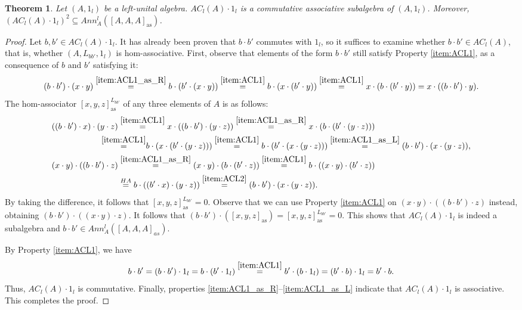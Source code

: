 \documentclass[12pt]{article}
\newtheorem{theorem}{Theorem}
\begin{document}
		\begin{theorem}\label{thm:ACL1_subalgebra}
			Let $(A,1_l)$ be a left-unital algebra. $AC_l(A)\cdot 1_l$ is a commutative associative subalgebra of $(A,1_l)$.
			Moreover, $\left(AC_l(A)\cdot 1_l\right)^2\subseteq Ann_A^l([A,A,A]_{\mathrm{as}})$.
		\end{theorem}
		\begin{proof}
			Let $b,b'\in AC_l(A)\cdot 1_l$. It has already been proven that $b\cdot b'$ commutes with $1_l$, so it suffices to examine whether $b\cdot b'\in AC_l(A)$, that is, whether $(A,L_{bb'},1_l)$ is hom-associative. First, observe that elements of the form $b\cdot b'$ still satisfy Property \ref{item:ACL1}, as a consequence of $b$ and $b'$ satisfying it:
			\begin{equation*}
				(b\cdot b')\cdot (x\cdot y)\overset{\ref{item:ACL1_as_R}}{=}b\cdot (b'\cdot (x\cdot y))\overset{\ref{item:ACL1}}{=}b\cdot (x\cdot (b'\cdot y))\overset{\ref{item:ACL1}}{=}x\cdot (b\cdot (b'\cdot y))=x\cdot ((b\cdot b')\cdot y).
			\end{equation*}
			The hom-associator $[x,y,z]_{\mathrm{as}}^{L_{bb'}}$ of any three elements of $A$ is as follows:
			\begin{align*}
				& ((b\cdot b')\cdot x)\cdot (y\cdot z)\overset{\ref{item:ACL1}}{=}x\cdot ((b\cdot b')\cdot (y\cdot z))\overset{\ref{item:ACL1_as_R}}{=}x\cdot (b\cdot (b'\cdot (y\cdot z)))\\
				& \hspace{2.1cm} \overset{\ref{item:ACL1}}{{=}}b\cdot (x\cdot (b'\cdot (y\cdot z)))\overset{\ref{item:ACL1}}{=}b\cdot (b'\cdot (x\cdot (y\cdot z)))\overset{\ref{item:ACL1_as_L}}{=}(b\cdot b')\cdot (x\cdot (y\cdot z)),\\
				& (x\cdot y)\cdot ((b\cdot b')\cdot z)\overset{\ref{item:ACL1_as_R}}{=}(x\cdot y)\cdot (b\cdot (b'\cdot z))\overset{\ref{item:ACL1}}{=}b\cdot ((x\cdot y)\cdot (b'\cdot z))\\
				& \hspace{2.8cm} \overset{HA}{=} b\cdot ((b'\cdot x)\cdot (y\cdot z))\overset{\ref{item:ACL2}}{=}(b\cdot b')\cdot (x\cdot (y\cdot z)).
			\end{align*}
			By taking the difference, it follows that $[x,y,z]_{\mathrm{as}}^{L_{bb'}}=0$. Observe that we can use Property \ref{item:ACL1} on $(x\cdot y)\cdot ((b\cdot b')\cdot z)$ instead, obtaining
			$(b\cdot b')\cdot ((x\cdot y)\cdot z)$. It follows that $(b\cdot b')\cdot ([x,y,z]_{\mathrm{as}})=[x,y,z]_{\mathrm{as}}^{L_{bb'}}=0$. This shows that $AC_l(A)\cdot 1_l$ is indeed a subalgebra and $b\cdot b'\in Ann_A^l([A,A,A]_{as})$.
			
			By Property \ref{item:ACL1}, we have
			\begin{equation*}
				b\cdot b'=(b\cdot b')\cdot 1_l=b\cdot (b'\cdot 1_l)\overset{\ref{item:ACL1}}{=}b'\cdot (b\cdot 1_l)=(b'\cdot b)\cdot 1_l=b'\cdot b.
			\end{equation*}
			Thus, $AC_l(A)\cdot 1_l$ is commutative. Finally, properties \ref{item:ACL1_as_R}--\ref{item:ACL1_as_L} indicate that $AC_l(A)\cdot 1_l$ is associative. This completes the proof.
		\end{proof}
\end{document}
